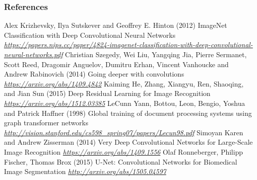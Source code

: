 \begin{vbframe}
\frametitle{References}
\footnotesize{
\begin{thebibliography}{99}
 Alex Krizhevsky, Ilya Sutskever and Geoffrey E. Hinton (2012)
\newblock ImageNet Classification with Deep Convolutional Neural Networks
\newblock \emph{\url{https://papers.nips.cc/paper/4824-imagenet-classification-with-deep-convolutional-neural-networks.pdf}}
 Christian Szegedy, Wei Liu, Yangqing Jia, Pierre Sermanet, Scott Reed, Dragomir Anguelov, Dumitru Erhan, Vincent Vanhoucke and Andrew Rabinovich (2014)
\newblock Going deeper with convolutions
\newblock \emph{\url{https://arxiv.org/abs/1409.4842}}
 Kaiming He, Zhang, Xiangyu, Ren, Shaoqing, and Jian Sun (2015)
\newblock Deep Residual Learning for Image Recognition
\newblock \emph{\url{https://arxiv.org/abs/1512.03385}}
 LeCunn Yann, Bottou, Leon, Bengio, Yoshua and Patrick Haffner (1998)
\newblock Global training of document processing systems using graph transformer networks
\newblock \emph{\url{http://vision.stanford.edu/cs598_spring07/papers/Lecun98.pdf}}
 Simoyan Karen and Andrew Zisserman (2014)
\newblock Very Deep Convolutional Networks for Large-Scale Image Recognition
\newblock \emph{\url{https://arxiv.org/abs/1409.1556}}
 Olaf Ronneberger, Philipp Fischer, Thomas Brox (2015)
\newblock U-Net: Convolutional Networks for Biomedical Image Segmentation
\newblock \emph{\url{http://arxiv.org/abs/1505.04597}}

\end{thebibliography}
}
\end{vbframe}
\endlecture
